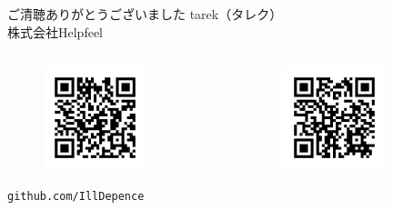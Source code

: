 \documentclass[lualatex,aspectratio=169]{beamer}
\begin{document}
\begin{frame}[t]{ご清聴ありがとうございました}
    tarek（タレク）\\
    株式会社Helpfeel
    \begin{columns}
    \begin{column}{0.3\textwidth}
        \begin{center}
        \begin{figure}
        \includegraphics[width=0.7\textwidth]{./img/qr_github.png}
        \end{figure}
        \footnotesize\texttt{github.com/IllDepence}
        \end{center}
    \end{column}
    \begin{column}{0.3\textwidth}
        \begin{center}
        \begin{figure}
        \includegraphics[width=0.7\textwidth]{./img/qr_blog.png}

\end{figure}
\end{center}
\end{column}
\end{columns}
\end{frame}
\end{document}
